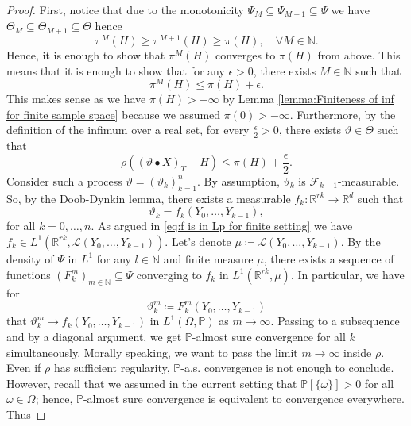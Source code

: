 \documentclass[11pt,a4paper,twoside,openany]{report}
\numberwithin{equation}{section}
\theoremstyle{plain} %
\theoremstyle{definition} %
\theoremstyle{remark} %
\begin{document}
\begin{proof}
 First, notice that due to the monotonicity \(\Psi_M\subseteq\Psi_{M+1}\subseteq\Psi\) we have \(\Theta_M\subseteq\Theta_{M+1}\subseteq\Theta\) hence 
 \begin{equation*}
     \pi^M(H)\geq\pi^{M+1}(H)\geq\pi(H),\quad\forall M\in\mathbb{N}.
 \end{equation*}
 Hence, it is enough to show that \(\pi^M(H)\) converges to \(\pi(H)\) from above. This means that it is enough to show that for any \(\epsilon>0\), there exists \(M\in\mathbb{N}\) such that 
 \begin{equation*}
     \pi^M(H)\leq \pi(H)+\epsilon.
 \end{equation*}
 This makes sense as we have \(\pi(H)>-\infty\) by Lemma \ref{lemma:Finiteness of inf for finite sample space} because we assumed \(\pi(0)>-\infty\).
 Furthermore, by the definition of the infimum over a real set, for every \(\frac{\epsilon}{2}>0\), there exists \(\vartheta\in\Theta\) such that
 \begin{equation*}
     \rho((\vartheta\bullet X)_T-H)\leq\pi(H)+\frac{\epsilon}{2}.
 \end{equation*}
 Consider such a process \(\vartheta=(\vartheta_k)_{k=1}^n\). By assumption, \(\vartheta_k\) is \(\mathcal{F}_{k-1}\)-measurable. So, by the Doob-Dynkin lemma, there exists a measurable \(f_k:\mathbb{R}^{rk}\to\mathbb{R}^d\) such that 
 \begin{equation*}
     \vartheta_k=f_k(Y_0,\dots,Y_{k-1}),
 \end{equation*}
 for all \(k=0,\dots,n\). As argued in \eqref{eq:f is in Lp for finite setting} we have \(f_k\in L^1(\mathbb{R}^{rk},\mathcal{L}(Y_0,\dots,Y_{k-1}))\). Let's denote \(\mu\coloneqq\mathcal{L}(Y_0,\dots,Y_{k-1})\). By the density of \(\Psi\) in \(L^1\) for any \(l\in\mathbb{N}\) and finite measure \(\mu\), there exists a sequence of functions \((F_k^m)_{m\in\mathbb{N}}\subseteq \Psi\) converging to \(f_k\) in \(L^1(\mathbb{R}^{rk},\mu)\). In particular, we have for 
 \begin{equation*}
     \vartheta_{k}^m\coloneqq F_{k}^m(Y_0,\dots,Y_{k-1})
 \end{equation*}
 that \(\vartheta_{k}^m\to f_k(Y_0,\dots,Y_{k-1})\) in \(L^1(\Omega,\mathbb{P})\) as \(m\to\infty\). Passing to a subsequence and by a diagonal argument, we get \(\mathbb{P}\)-almost sure convergence for all \(k\) simultaneously. Morally speaking, we want to pass the limit \(m\to\infty\) inside \(\rho\). Even if \(\rho\) has sufficient regularity, \(\mathbb{P}\)-a.s. convergence is not enough to conclude. However, recall that we assumed in the current setting that \(\mathbb{P}[\{\omega\}]>0\) for all \(\omega\in\Omega\); hence, \(\mathbb{P}\)-almost sure convergence is equivalent to convergence everywhere. Thus

\end{proof}
\end{document}
